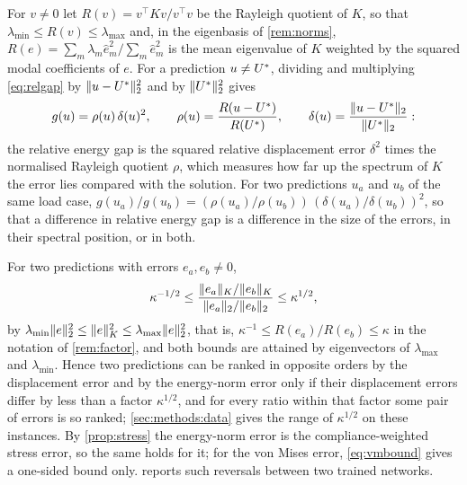 \begin{remark}\label{rem:factor}
For $v\neq0$ let $R(v)=v^{\top}Kv/v^{\top}v$ be the Rayleigh quotient of $K$, so that
$\lambda_{\min}\le R(v)\le\lambda_{\max}$ and, in the eigenbasis of \cref{rem:norms},
$R(e)=\sum_m\lambda_m\hat e_m^2/\sum_m\hat e_m^2$ is the mean eigenvalue of $K$ weighted by
the squared modal coefficients of $e$. For a prediction $u\neq U^{\ast}$, dividing and
multiplying \eqref{eq:relgap} by $\lVert u-U^{\ast}\rVert_2^2$ and by $\lVert U^{\ast}\rVert_2^2$ gives
\begin{equation}
g(u)=\rho(u)\,\delta(u)^{2},
\qquad
\rho(u)=\frac{R(u-U^{\ast})}{R(U^{\ast})},
\qquad
\delta(u)=\frac{\lVert u-U^{\ast}\rVert_2}{\lVert U^{\ast}\rVert_2}:
\label{eq:factor}
\end{equation}
the relative energy gap is the squared relative displacement error $\delta^2$ times the
normalised Rayleigh quotient $\rho$, which measures how far up the spectrum of $K$ the error
lies compared with the solution. For two predictions $u_a$ and $u_b$ of the same load case,
$g(u_a)/g(u_b)=(\rho(u_a)/\rho(u_b))\,(\delta(u_a)/\delta(u_b))^2$, so that a difference
in relative energy gap is a difference in the size of the errors, in their spectral
position,
or in both.
\end{remark}

\begin{remark}\label{rem:rank}
For two predictions with errors $e_a,e_b\neq0$,
\begin{equation}
\kappa^{-1/2} \le \frac{\lVert e_a\rVert_K/\lVert e_b\rVert_K}{\lVert e_a\rVert_2/\lVert e_b\rVert_2} \le \kappa^{1/2},
\label{eq:rank}
\end{equation}
by $\lambda_{\min}\lVert e\rVert_2^2\le\lVert e\rVert_K^2\le\lambda_{\max}\lVert e\rVert_2^2$, that is,
$\kappa^{-1}\le R(e_a)/R(e_b)\le\kappa$ in the notation of \cref{rem:factor}, and both
bounds are attained by eigenvectors of $\lambda_{\max}$ and $\lambda_{\min}$. Hence two
predictions can be ranked in opposite orders by the displacement error and by the
energy-norm error only if their displacement errors differ by less than a factor
$\kappa^{1/2}$, and for every ratio within that factor some pair of errors is so ranked;
\cref{sec:methods:data} gives the range of $\kappa^{1/2}$ on these instances. By
\cref{prop:stress} the energy-norm error is the compliance-weighted stress error, so the
same holds for it; for the von Mises error, \eqref{eq:vmbound} gives a one-sided bound only.
 reports such reversals between two trained networks.
\end{remark}

